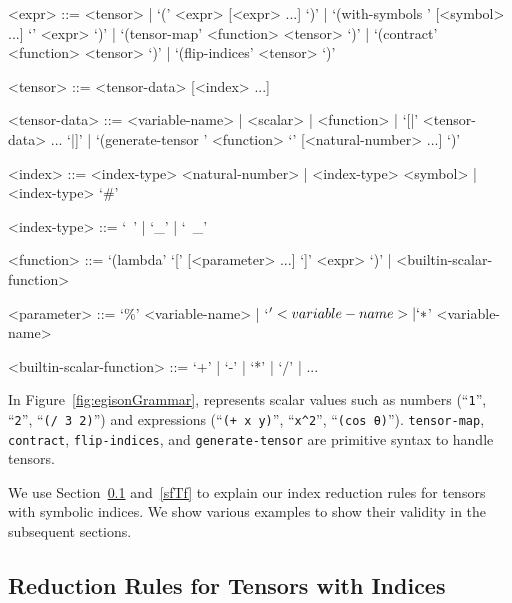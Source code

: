 \documentclass[acmlarge]{acmart}
\begin{document}
\begin{figure*}
  \begin{center}
\begin{grammar}
  <expr> ::= <tensor> | `(' <expr> [<expr> ...] `)' | `(with-symbols {' [<symbol> ...] `}' <expr> `)' | `(tensor-map' <function> <tensor> `)' | `(contract' <function> <tensor> `)' | `(flip-indices' <tensor> `)'

  <tensor> ::= <tensor-data> [<index> ...]

  <tensor-data> ::= <variable-name> | <scalar> | <function> | `[|' <tensor-data> ... `|]' | `(generate-tensor ' <function> `{' [<natural-number> ...] `})'
  
  <index> ::= <index-type> <natural-number> | <index-type> <symbol> | <index-type> `#'

  <index-type> ::= `~' | `_' | `~_'

  <function> ::= `(lambda' `[' [<parameter> ...] `]' <expr> `)' | <builtin-scalar-function>

  <parameter> ::= `\%' <variable-name> | `$' <variable-name> | `*$' <variable-name>
  
  <builtin-scalar-function> ::= `+' | `-' | `*' | `/' | ...
\end{grammar}
  \end{center}
  \caption{Grammar for index notation}
  \label{fig:egisonGrammar}
\end{figure*}

In Figure~\ref{fig:egisonGrammar},  represents scalar values such as numbers (``\texttt{1}'', ``\texttt{2}'', ``\texttt{(/ 3 2)}'') and expressions (``\texttt{(+ x y)}'', ``\verb|x^2|'', ``\texttt{(cos θ)}'').
\texttt{tensor-map}, \texttt{contract}, \texttt{flip-indices}, and \texttt{generate-tensor} are primitive syntax to handle tensors.

We use Section~\ref{egisonIndex} and~\ref{sfTf} to explain our index reduction rules for tensors with symbolic indices.
We show various examples to show their validity in the subsequent sections.

\subsection{Reduction Rules for Tensors with Indices}\label{egisonIndex}

\end{document}
